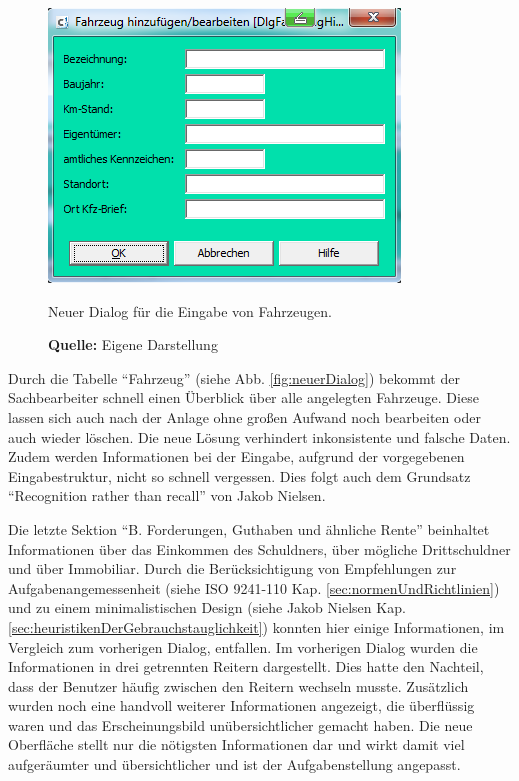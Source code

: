 \begin{figure}[H]
  \centering
  \includegraphics[scale=0.9]{img/FahrzeugAnlegenBearbeiten_Dialog.PNG}
  \caption{Neuer Dialog für die Eingabe von Fahrzeugen.}
    \caption*{\textbf{Quelle:} Eigene Darstellung}
  \label{fig:fahrzeugAnlegenBearbeitenDialog}
\end{figure}
Durch die Tabelle \enquote{Fahrzeug} (siehe Abb. \ref{fig:neuerDialog}) bekommt der Sachbearbeiter schnell einen Überblick über alle angelegten Fahrzeuge. Diese lassen sich auch nach der Anlage ohne großen Aufwand noch bearbeiten oder auch wieder löschen. Die neue Lösung verhindert inkonsistente und falsche Daten. Zudem werden Informationen bei der Eingabe, aufgrund der vorgegebenen Eingabestruktur, nicht so schnell vergessen. Dies folgt auch dem Grundsatz \enquote{Recognition rather than recall} von Jakob Nielsen.

Die letzte Sektion \enquote{B. Forderungen, Guthaben und ähnliche Rente} beinhaltet Informationen über das Einkommen des Schuldners, über mögliche Drittschuldner und über Immobiliar. Durch die Berücksichtigung von Empfehlungen zur Aufgabenangemessenheit (siehe ISO 9241-110 Kap. \ref{sec:normenUndRichtlinien}) und zu einem minimalistischen Design (siehe Jakob Nielsen Kap. \ref{sec:heuristikenDerGebrauchstauglichkeit}) konnten hier einige Informationen, im Vergleich zum vorherigen Dialog, entfallen. Im vorherigen Dialog wurden die Informationen in drei getrennten Reitern dargestellt. Dies hatte den Nachteil, dass der Benutzer häufig zwischen den Reitern wechseln musste. Zusätzlich wurden noch eine handvoll weiterer Informationen angezeigt, die überflüssig waren und das Erscheinungsbild unübersichtlicher gemacht haben. Die neue Oberfläche stellt nur die nötigsten Informationen dar und wirkt damit viel aufgeräumter und übersichtlicher und ist der Aufgabenstellung angepasst.

